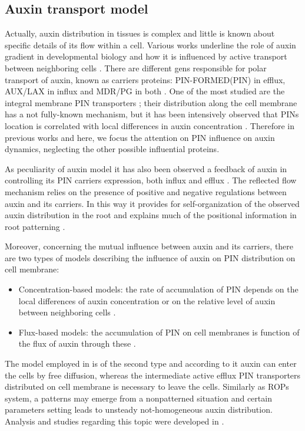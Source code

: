 \subsection{Auxin transport model} \label{sec:auxtra}
Actually, auxin distribution in tissues is complex and little is known about specific details of its flow within a cell. Various works underline the role of auxin gradient in developmental biology and how it is influenced by active transport between neighboring cells \cite{Mironova:6, Mironova:7}. There are different gens responsible for polar transport of auxin, known as carriers proteins: PIN-FORMED(PIN) in efflux, AUX/LAX in influx and MDR/PG in both \cite{phdthesis:victor}. One of the most studied are the integral membrane PIN transporters \cite{plant:Mironova, plant:Alim}; their distribution along the cell membrane has a not fully-known mechanism, but it has been intensively observed that PINs location is correlated with local differences in auxin concentration \cite{farcot:14}. Therefore in previous works and here, we focus the attention on PIN influence on auxin dynamics, neglecting the other possible influential proteins.

As peculiarity of auxin model it has also been observed a feedback of auxin in controlling its PIN carriers expression, both influx and efflux \cite{plant:Mironova}. The reflected flow mechanism relies on the presence of positive and negative regulations between auxin and its carriers. In this way it provides for self-organization of the observed auxin distribution in the root and explains much of the positional information in root patterning \cite{Mironova:25}.

Moreover, concerning the mutual influence between auxin and its carriers, there are two types of models describing the influence of auxin on PIN distribution on cell membrane:
\begin{itemize}
    \item Concentration-based models: the rate of accumulation of PIN depends on the local differences of auxin concentration or on the relative level of auxin between neighboring cells \cite{farcot:25}.
    \item Flux-based models: the accumulation of PIN on cell membranes is function of the flux of auxin through these \cite{farcot:27}.
\end{itemize}

The model employed in \cite{plant:Farcot} is of the second type and according to it auxin can enter the cells by free diffusion, whereas the intermediate active efflux PIN transporters distributed on cell membrane is necessary to leave the cells. Similarly as ROPs system, a patterns may emerge from a nonpatterned situation and certain parameters setting leads to unsteady not-homogeneous auxin distribution. Analysis and studies regarding this topic were developed in \cite{plant:Farcot}.

